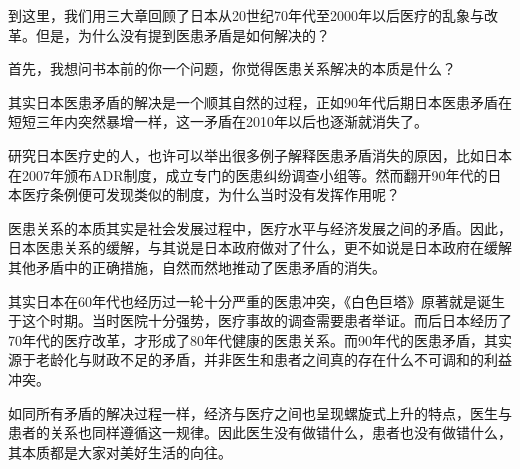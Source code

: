 到这里，我们用三大章回顾了日本从20世纪70年代至2000年以后医疗的乱象与改革。但是，为什么没有提到医患矛盾是如何解决的？

首先，我想问书本前的你一个问题，你觉得医患关系解决的本质是什么？

其实日本医患矛盾的解决是一个顺其自然的过程，正如90年代后期日本医患矛盾在短短三年内突然暴增一样，这一矛盾在2010年以后也逐渐就消失了。

研究日本医疗史的人，也许可以举出很多例子解释医患矛盾消失的原因，比如日本在2007年颁布ADR制度，成立专门的医患纠纷调查小组等。然而翻开90年代的日本医疗条例便可发现类似的制度，为什么当时没有发挥作用呢？

医患关系的本质其实是社会发展过程中，医疗水平与经济发展之间的矛盾。因此，日本医患关系的缓解，与其说是日本政府做对了什么，更不如说是日本政府在缓解其他矛盾中的正确措施，自然而然地推动了医患矛盾的消失。

其实日本在60年代也经历过一轮十分严重的医患冲突，《白色巨塔》原著就是诞生于这个时期。当时医院十分强势，医疗事故的调查需要患者举证。而后日本经历了70年代的医疗改革，才形成了80年代健康的医患关系。而90年代的医患矛盾，其实源于老龄化与财政不足的矛盾，并非医生和患者之间真的存在什么不可调和的利益冲突。

如同所有矛盾的解决过程一样，经济与医疗之间也呈现螺旋式上升的特点，医生与患者的关系也同样遵循这一规律。因此医生没有做错什么，患者也没有做错什么，其本质都是大家对美好生活的向往。

